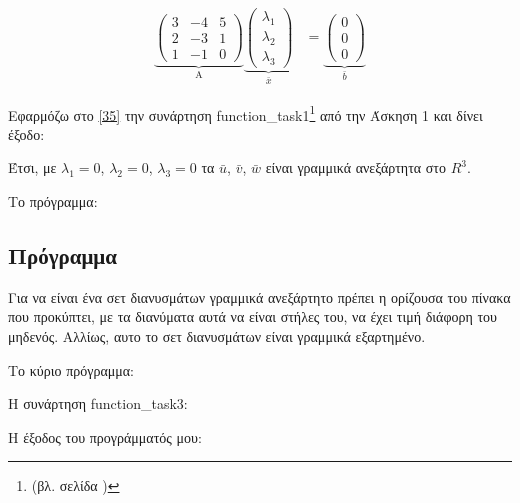 \documentclass[12pt]{extreport}
\begin{document}
\begin{equation}
    \begin{aligned}%
        \underbrace{
            \begin{pmatrix}
                3 & -4 & 5 \\
                2 & -3 & 1 \\
                1 & -1 & 0
            \end{pmatrix}
        }_\text{A}
        \underbrace{
            \begin{pmatrix}
                \lambda_{1} \\
                \lambda_{2} \\
                \lambda_{3}
            \end{pmatrix}
        }_\text{$\bar{x}$}
         & =
        \underbrace{
            \begin{pmatrix}
                0 \\
                0 \\
                0
            \end{pmatrix}
        }_\text{$\bar{b}$}
    \end{aligned}\label{35}
\end{equation}

Εφαρμόζω στο \eqref{35} την συνάρτηση function\_task1\footnote{(βλ. σελίδα \pageref{function_task1})} από την Άσκηση 1 και δίνει έξοδο:

Έτσι, με $\lambda_{1} = 0$, $\lambda_{2} = 0$, $\lambda_{3} = 0$ τα $\bar{u}$, $\bar{v}$, $\bar{w}$ είναι γραμμικά ανεξάρτητα στο $R^{3}$.

Το πρόγραμμα:

\newpage

\subsection{Πρόγραμμα}

Για να είναι ένα σετ διανυσμάτων γραμμικά ανεξάρτητο πρέπει η ορίζουσα του πίνακα που προκύπτει, με τα διανύματα αυτά να είναι στήλες του, να έχει τιμή διάφορη του μηδενός. Αλλίως, αυτο το σετ διανυσμάτων είναι γραμμικά εξαρτημένο.

Το κύριο πρόγραμμα:


Η συνάρτηση function\_task3:


Η έξοδος του προγράμματός μου:

\end{document}
